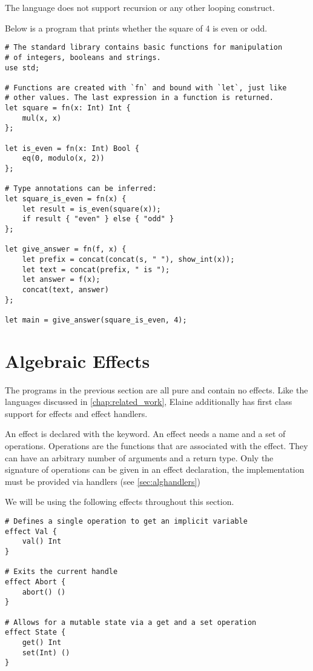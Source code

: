 The language does not support recursion or any other looping construct.

Below is a program that prints whether the square of 4 is even or odd. 

\begin{lstlisting}[language=elaine, style=fancy]
# The standard library contains basic functions for manipulation
# of integers, booleans and strings.
use std;

# Functions are created with `fn` and bound with `let`, just like
# other values. The last expression in a function is returned.
let square = fn(x: Int) Int {
    mul(x, x)
};

let is_even = fn(x: Int) Bool {
    eq(0, modulo(x, 2))
};

# Type annotations can be inferred:
let square_is_even = fn(x) {
    let result = is_even(square(x));
    if result { "even" } else { "odd" }
};

let give_answer = fn(f, x) {
	let prefix = concat(concat(s, " "), show_int(x));
    let text = concat(prefix, " is ");
    let answer = f(x);
    concat(text, answer)
};

let main = give_answer(square_is_even, 4);
\end{lstlisting}

\section{Algebraic Effects}

The programs in the previous section are all pure and contain no effects. Like the languages discussed in \cref{chap:related_work}, Elaine additionally has first class support for effects and effect handlers.

An effect is declared with the  keyword. An effect needs a name and a set of operations. Operations are the functions that are associated with the effect. They can have an arbitrary number of arguments and a return type. Only the signature of operations can be given in an effect declaration, the implementation must be provided via handlers (see \cref{sec:alghandlers})

We will be using the following effects throughout this section.
\begin{lstlisting}[language=elaine, style=fancy]
# Defines a single operation to get an implicit variable
effect Val {
    val() Int
}

# Exits the current handle
effect Abort {
    abort() ()
}

# Allows for a mutable state via a get and a set operation
effect State {
    get() Int
    set(Int) ()
}
\end{lstlisting}

